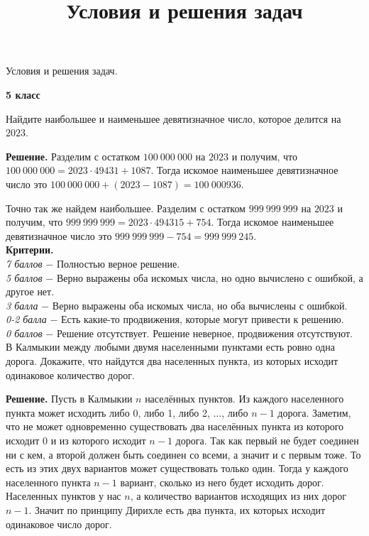\centerline{\Huge Условия и решения задач.}
\centerline{\bf \Huge 5 класс}

\title{Условия и решения задач}

 Найдите наибольшее и наименьшее девятизначное число, которое делится на $2023$. \par
\textbf{Решение.} Разделим с остатком $100 \ 000 \ 000$ на $2023$ и получим, что $100 \ 000 \ 000 = 2023\cdot 49431 + 1087$. Тогда искомое наименьшее девятизначное число это $100 \ 000 \ 000 + (2023 - 1087) = 100 \ 000 936.$ \par
Точно так же найдем наибольшее. Разделим с остатком $999 \ 999 \ 999$ на $2023$ и получим, что $999 \ 999 \ 999 = 2023\cdot 494315 + 754$. Тогда искомое наименьшее девятизначное число это $999 \ 999 \ 999 - 754 = 999 \ 999 \ 245.$ \\

\textbf{Критерии.} \\
\textit{7 баллов} $-$ Полностью верное решение. \\
\textit{5 баллов} $-$ Верно выражены оба искомых числа, но одно вычислено с ошибкой, а другое нет. \\ 
\textit{3 балла} $-$ Верно выражены оба искомых числа, но оба вычислены с ошибкой. \\ 
\textit{0-2 балла} $-$ Есть какие-то продвижения, которые могут привести к решению. \\ 
\textit{0 баллов} $-$ Решение отсутствует. Решение неверное, продвижения отсутствуют. \\ 

 В Калмыкии между любыми двумя населенными пунктами есть ровно одна дорога. Докажите, что найдутся два населенных пункта, из которых исходит одинаковое количество дорог. \par

\textbf{Решение.} Пусть в Калмыкии $n$ населённых пунктов. Из каждого населенного пункта может исходить либо 0, либо 1, либо 2, $\dotsc$, либо $n-1$ дорога. Заметим, что не может одновременно существовать два населённых пункта из которого исходит 0 и из которого исходит $n-1$ дорога. Так как первый не будет соединен ни с кем, а второй должен быть соединен со всеми, а значит и с первым тоже. То есть из этих двух вариантов может существовать только один. Тогда у каждого населенного пункта $n-1$ вариант, сколько из него будет исходить дорог. Населенных пунктов у нас $n$, а количество вариантов исходящих из них дорог $n-1$. Значит по принципу Дирихле есть два пункта, их которых исходит одинаковое число дорог. 
\\

